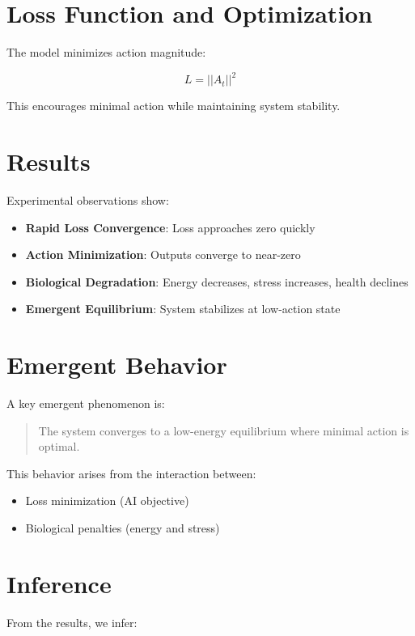 \documentclass[12pt]{article}
\begin{document}
\section{Loss Function and Optimization}

The model minimizes action magnitude:

\[
L = ||A_t||^2
\]

This encourages minimal action while maintaining system stability.

\section{Results}

Experimental observations show:

\begin{itemize}
\item \textbf{Rapid Loss Convergence}: Loss approaches zero quickly
\item \textbf{Action Minimization}: Outputs converge to near-zero
\item \textbf{Biological Degradation}: Energy decreases, stress increases, health declines
\item \textbf{Emergent Equilibrium}: System stabilizes at low-action state
\end{itemize}

\section{Emergent Behavior}

A key emergent phenomenon is:

\begin{quote}
The system converges to a low-energy equilibrium where minimal action is optimal.
\end{quote}

This behavior arises from the interaction between:

\begin{itemize}
\item Loss minimization (AI objective)
\item Biological penalties (energy and stress)
\end{itemize}

\section{Inference}

From the results, we infer:
\end{document}
